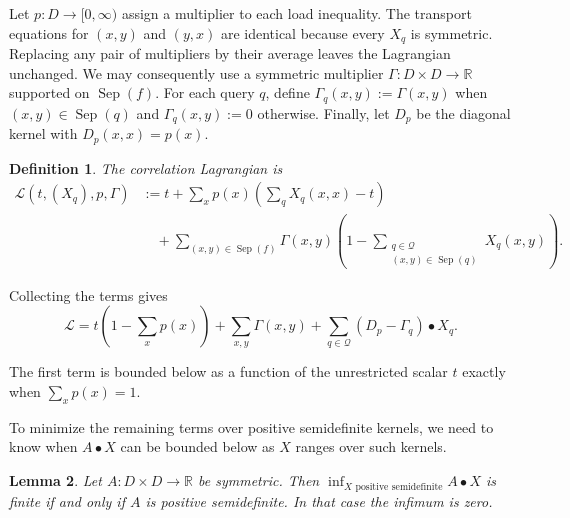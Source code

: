 \documentclass[11pt]{article}
\numberwithin{equation}{section}
\newtheorem{definition}{Definition}[section]
\newtheorem{lemma}[definition]{Lemma}
\theoremstyle{remark}
\begin{document}
Let $p:D\to[0,\infty)$ assign a multiplier to each load inequality. The
transport equations for $(x,y)$ and $(y,x)$ are identical because every
$X_q$ is symmetric. Replacing any pair of multipliers by their average
leaves the Lagrangian unchanged. We may consequently use a
symmetric multiplier $\Gamma:D\times D\to\mathbb R$ supported on
$\operatorname{Sep}(f)$. For each query $q$, define
$\Gamma_q(x,y):=\Gamma(x,y)$ when $(x,y)\in\operatorname{Sep}(q)$ and
$\Gamma_q(x,y):=0$ otherwise. Finally, let $D_p$ be the diagonal kernel with
$D_p(x,x)=p(x)$.

\begin{definition}
\label{def:correlation-transport-lagrangian}
The \emph{correlation Lagrangian} is
\begin{equation}
\begin{aligned}
    \mathcal L(t,(X_q),p,\Gamma)
    &:=
    t
    +
    \sum_x
        p(x)
        \left(
            \sum_qX_q(x,x)-t
        \right)\\
    &\quad+
    \sum_{(x,y)\in\operatorname{Sep}(f)}
        \Gamma(x,y)
        \left(
            1-
            \sum_{\substack{q\in\mathcal Q\\
                            (x,y)\in\operatorname{Sep}(q)}}
                X_q(x,y)
        \right).
\end{aligned}
\end{equation}
\end{definition}

Collecting the terms gives
\begin{equation}
    \mathcal L
    =
    t\left(1-\sum_xp(x)\right)
    +
    \sum_{x,y}\Gamma(x,y)
    +
    \sum_{q\in\mathcal Q}
        (D_p-\Gamma_q)\mathbin{\bullet}X_q.
\end{equation}

The first term is bounded below as a function of the unrestricted scalar
$t$ exactly when $\sum_xp(x)=1$.

To minimize the remaining terms over positive semidefinite kernels, we need to know when
$A\mathbin{\bullet}X$ can be bounded below as $X$ ranges over such kernels.

\begin{lemma}
\label{lem:positive-kernel-self-duality}
Let $A:D\times D\to\mathbb R$ be symmetric. Then
$\inf_{X\text{ positive semidefinite}}A\mathbin{\bullet}X$ is finite if and only if
$A$ is positive semidefinite. In that case the infimum is zero.
\end{lemma}
\end{document}

